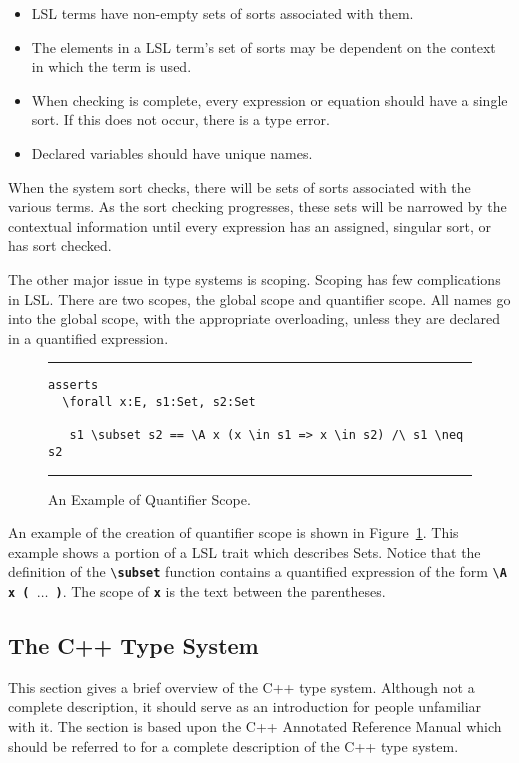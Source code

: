 \documentclass[12pt]{article} %
\newcommand{\reserved}[1]{\textbf{\texttt{#1}}} %
\newcommand{\UNSPACEFORBOX}{\vspace{-2ex}}
\newcommand{\HLINE}{\UNSPACEFORBOX%
\begin{flushleft}\rule{\textwidth}{0.01in}\end{flushleft}%
\UNSPACEFORBOX}
\newenvironment{BFIGURE}{

\begin{figure}
\small
\HLINE
}{
\HLINE
\normalsize
\end{figure}
}
\begin{document}
\begin{itemize}
\item LSL terms have non-empty sets of sorts associated with them. 
\item The elements in a LSL term's set of sorts may be dependent on
the context in which the term is used.
\item When checking is complete, every expression or equation
should have a single sort. If this does not occur, there is a type error.\item Declared variables should have unique names.
\end{itemize}

\noindent When the system sort checks, there will be sets of sorts
associated with the various terms. As the sort checking progresses,
these sets will be narrowed by the contextual information until every
expression has an assigned, singular sort, or has sort checked.

The other major issue in type systems is scoping. Scoping has few
complications in LSL. There are two scopes, the global scope and
quantifier scope. All names go into the global scope, with the
appropriate overloading, unless they are declared in a quantified
expression. 


\begin{BFIGURE}
\begin{verbatim}
asserts
  \forall x:E, s1:Set, s2:Set

   s1 \subset s2 == \A x (x \in s1 => x \in s2) /\ s1 \neq s2

\end{verbatim}
\caption{An Example of Quantifier Scope.}
\label{quantscope}
\end{BFIGURE}

An example of the creation of quantifier scope is shown in
Figure~\ref{quantscope}. This example shows a portion of a LSL trait
which describes Sets. Notice that the definition of the
\verb+\+\reserved{subset} function contains a quantified
expression of the form \verb+\+\reserved{A x ( $\dots$ )}. The scope
of \reserved{x} is the text between the parentheses. 


\subsection{The C++ Type System}
\label{cppts}
This section gives a brief overview of the C++ type
system. Although not a complete description, it should serve as an
introduction for people unfamiliar with it. The section is based upon the C++
Annotated Reference Manual \cite{Ellis-Stroustrup90} which should be
referred to for a complete description of the C++ type system.
\end{document}
